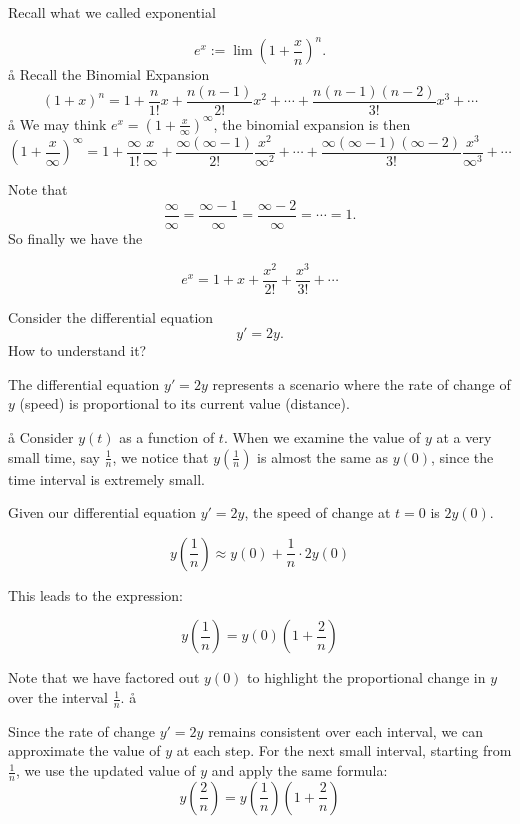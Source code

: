 
Recall what we called exponential

$$
e^x:= \lim \left(1+\frac xn\right)^n.
$$
\a\aa
Recall the Binomial Expansion
$$
(1+x)^n = 1 + \frac n{1!} x +\frac{n(n-1)}{2!} x^2 +\cdots+\frac{n(n-1)(n-2)}{3!} x^3+\cdots
$$
\a\aa
We may think $e^x = (1+\frac x{{∞}})^{∞}$, the binomial expansion is then 
$$
\left(1+\frac x{{∞}}\right)^{∞} = 1 + \frac {∞}{1!} \frac x{∞} +\frac{{∞}({∞}-1)}{2!} \frac {x^2}{{∞}^2} +\cdots+\frac{{∞}({∞}-1)({∞}-2)}{3!} \frac{x^3}{{∞}^3}+\cdots
$$

Note that
$$
\frac{∞}{∞} = \frac{∞-1}{∞} = \frac{∞-2}{∞} = \cdots = 1.
$$
So finally we have the 

$$
e^x = 1+x+\frac{x^2}{2!}+\frac{x^3}{3!}+\cdots
$$
\aaa


Consider the differential equation
$$
y' = 2y.
$$
How to understand it?

\vfill
The differential equation \( y' = 2y \) represents a scenario where the rate of change of \( y \) (speed) is proportional to its current value (distance).


\a\aa
Consider \( y(t) \) as a function of \( t \). When we examine the value of \( y \) at a very small time, say \( \frac{1}{n} \), we notice that \( y\left(\frac{1}{n}\right) \) is almost the same as \( y(0) \), since the time interval is extremely small.

\vfill
Given our differential equation \( y' = 2y \), the speed of change at \( t = 0 \) is \( 2y(0) \). %

$$
y\left(\frac{1}{n}\right) \approx y(0) + \frac{1}{n} \cdot 2y(0)
$$

This leads to the expression:

$$
y\left(\frac{1}{n}\right) = y(0)\left(1 + \frac{2}{n}\right)
$$

Note that we have factored out \( y(0) \) to highlight the proportional change in \( y \) over the interval \( \frac{1}{n} \).
\a\aa

Since the rate of change \( y' = 2y \) remains consistent over each interval, we can approximate the value of \( y \) at each step.
\vfill
For the next small interval, starting from \( \frac{1}{n} \), we use the updated value of \( y \) and apply the same formula:
\vfill
$$
y\left(\frac{2}{n}\right) = y\left(\frac{1}{n}\right)\left(1 + \frac{2}{n}\right)
$$

